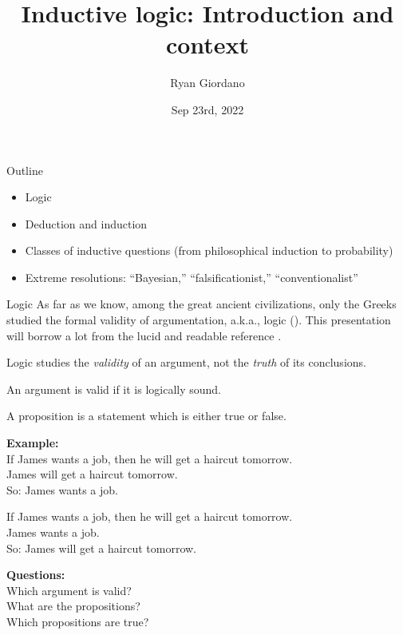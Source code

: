 \documentclass[8pt]{beamer}\usepackage[]{graphicx}\usepackage[]{color}
\title{Inductive logic: Introduction and context}
\author{Ryan Giordano}
\date{Sep 23rd, 2022}
\institute{Massachusetts Institute of Technology}
\begin{document}

\begin{frame}{Outline}
%
\begin{itemize}
%
\item Logic
\item Deduction and induction
\item Classes of inductive questions (from philosophical induction to probability)
\item Extreme resolutions: ``Bayesian,'' ``falsificationist,'' ``conventionalist''
%
\end{itemize}
%
\end{frame}


\begin{frame}{Logic}
%
As far as we know, among the great ancient civilizations, only the Greeks
studied the formal validity of argumentation, a.k.a., logic
(\cite{shenefelt:2013:ifathenb}).  This presentation will borrow a lot from the
lucid and readable reference \cite{hacking:2001:introduction}.

\pause
Logic studies the {\em validity} of an argument, not the {\em truth} of
its conclusions.

An argument is valid if it is logically sound.

A proposition is a statement which is either true or false.

\vspace{1em}
\textbf{Example: }\\
If James wants a job, then he will get a haircut tomorrow.\\
James will get a haircut tomorrow.\\
So: James wants a job.

\vspace{1em}
If James wants a job, then he will get a haircut tomorrow.\\
James wants a job.\\
So: James will get a haircut tomorrow.

\pause
\vspace{1em}
\textbf{Questions:} \\
Which argument is valid?  \\
What are the propositions?\\
Which propositions are true?
%
\end{frame}
\end{document}
